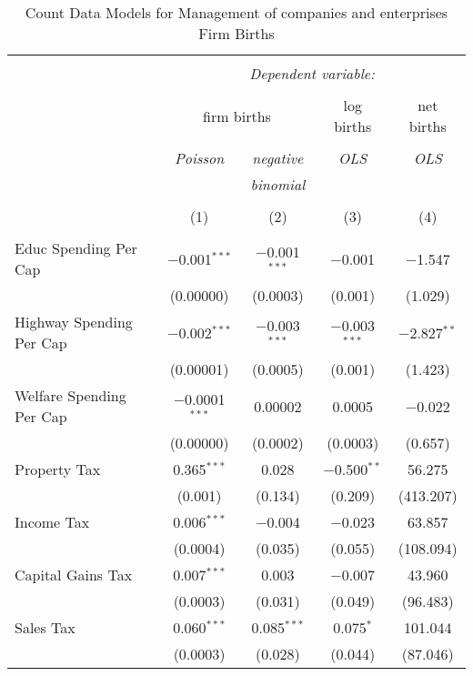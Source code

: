 
\begin{table}[!htbp] \centering 
  \caption{Count Data Models for Management of companies and enterprises Firm Births} 
  \label{} 
\begin{tabular}{@{\extracolsep{5pt}}lcccc} 
\\[-1.8ex]\hline 
\hline \\[-1.8ex] 
 & \multicolumn{4}{c}{\textit{Dependent variable:}} \\ 
\cline{2-5} 
\\[-1.8ex] & \multicolumn{2}{c}{firm births} & log births & net births \\ 
\\[-1.8ex] & \textit{Poisson} & \textit{negative} & \textit{OLS} & \textit{OLS} \\ 
 & \textit{} & \textit{binomial} & \textit{} & \textit{} \\ 
\\[-1.8ex] & (1) & (2) & (3) & (4)\\ 
\hline \\[-1.8ex] 
 Educ Spending Per Cap & $-$0.001$^{***}$ & $-$0.001$^{***}$ & $-$0.001 & $-$1.547 \\ 
  & (0.00000) & (0.0003) & (0.001) & (1.029) \\ 
  Highway Spending Per Cap  & $-$0.002$^{***}$ & $-$0.003$^{***}$ & $-$0.003$^{***}$ & $-$2.827$^{**}$ \\ 
  & (0.00001) & (0.0005) & (0.001) & (1.423) \\ 
  Welfare Spending Per Cap  & $-$0.0001$^{***}$ & 0.00002 & 0.0005 & $-$0.022 \\ 
  & (0.00000) & (0.0002) & (0.0003) & (0.657) \\ 
  Property Tax & 0.365$^{***}$ & 0.028 & $-$0.500$^{**}$ & 56.275 \\ 
  & (0.001) & (0.134) & (0.209) & (413.207) \\ 
  Income Tax & 0.006$^{***}$ & $-$0.004 & $-$0.023 & 63.857 \\ 
  & (0.0004) & (0.035) & (0.055) & (108.094) \\ 
  Capital Gains Tax & 0.007$^{***}$ & 0.003 & $-$0.007 & 43.960 \\ 
  & (0.0003) & (0.031) & (0.049) & (96.483) \\ 
  Sales Tax & 0.060$^{***}$ & 0.085$^{***}$ & 0.075$^{*}$ & 101.044 \\ 
  & (0.0003) & (0.028) & (0.044) & (87.046) \\ 

\end{tabular}
\end{table}
